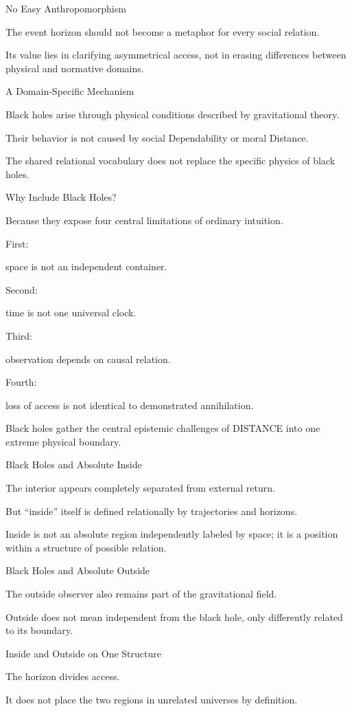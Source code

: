 No Easy Anthropomorphism

The event horizon should not become a metaphor for every social relation.

Its value lies in clarifying asymmetrical access, not in erasing differences between physical and normative domains.

A Domain-Specific Mechanism

Black holes arise through physical conditions described by gravitational theory.

Their behavior is not caused by social Dependability or moral Distance.

The shared relational vocabulary does not replace the specific physics of black holes.

Why Include Black Holes?

Because they expose four central limitations of ordinary intuition.

First:

space is not an independent container.

Second:

time is not one universal clock.

Third:

observation depends on causal relation.

Fourth:

loss of access is not identical to demonstrated annihilation.

Black holes gather the central epistemic challenges of DISTANCE into one extreme physical boundary.

Black Holes and Absolute Inside

The interior appears completely separated from external return.

But “inside” itself is defined relationally by trajectories and horizons.

Inside is not an absolute region independently labeled by space; it is a position within a structure of possible relation.

Black Holes and Absolute Outside

The outside observer also remains part of the gravitational field.

Outside does not mean independent from the black hole, only differently related to its boundary.

Inside and Outside on One Structure

The horizon divides access.

It does not place the two regions in unrelated universes by definition.

